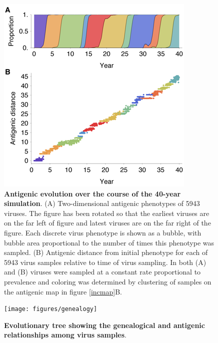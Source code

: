 \documentclass[11pt,oneside,letterpaper]{article}
\begin{document}
\begin{figure}[H]
	\centering
	\includegraphics{figures/phenotypes}
	\caption{\textbf{Antigenic evolution over the course of the 40-year simulation}. (A) Two-dimensional antigenic phenotypes of 5943 viruses.  The figure has been rotated so that the earliest viruses are on the far left of figure and latest viruses are on the far right of the figure.  Each discrete virus phenotype is shown as a bubble, with bubble area proportional to the number of times this phenotype was sampled. (B) Antigenic distance from initial phenotype for each of 5943 virus samples relative to time of virus sampling. In both (A) and (B) viruses were sampled at a constant rate proportional to prevalence and coloring was determined by clustering of samples on the antigenic map in figure \ref{incmap}B.}
	\label{phenotypes}
\end{figure}

\begin{figure}[H]
	\centering
	\texttt{[image: figures/genealogy]}
	\caption{\textbf{Evolutionary tree showing the genealogical and antigenic relationships among virus samples}.}
	\label{genealogy}
\end{figure}
\end{document}
